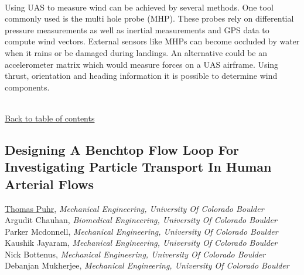 \noindent  \\ 
\noindent Using UAS to measure wind can be achieved by several methods. One tool commonly used is the multi hole probe (MHP). These probes rely on differential pressure measurements as well as inertial measurements and GPS data to compute wind vectors. External sensors like MHPs can become occluded by water when it rains or be damaged during landings. An alternative could be an accelerometer matrix which would measure forces on a UAS airframe. Using thrust, orientation and heading information it is possible to determine wind components. \\ 
\noindent  \\ 
\begin{flushright}\vspace{-0.2 in}\hyperlink{toc}{Back to table of contents}\end{flushright}\vspace{-0.2 in}
\hypertarget{ThomasPuhr}{\subsection*{\color{CUGOLD} Designing A Benchtop Flow Loop For Investigating Particle Transport In Human Arterial Flows}} \vsp 
\underline{Thomas Puhr}, \textit{Mechanical Engineering, University Of Colorado Boulder}\\ 
{Argudit Chauhan}, \textit{Biomedical Engineering, University Of Colorado Boulder}\\ 
{Parker Mcdonnell}, \textit{Mechanical Engineering, University Of Colorado Boulder}\\ 
{Kaushik Jayaram}, \textit{Mechanical Engineering, University Of Colorado Boulder}\\ 
{Nick Bottenus}, \textit{Mechanical Engineering, University Of Colorado Boulder}\\ 
{Debanjan Mukherjee}, \textit{Mechanical Engineering, University Of Colorado Boulder}\\ 
\vspace{-0.1 in} \\ 
